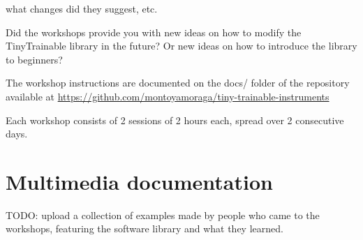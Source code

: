 what changes did they suggest, etc.

Did the workshops provide you with new ideas on how to modify the TinyTrainable library in the future? Or new ideas on how to introduce the library to beginners?



The workshop instructions are documented on the docs/ folder of the repository available at \url{https://github.com/montoyamoraga/tiny-trainable-instruments}

Each workshop consists of 2 sessions of 2 hours each, spread over 2 consecutive days.


\section{Multimedia documentation}

TODO: upload a collection of examples made by people who came to the workshops, featuring the software library and what they learned.
